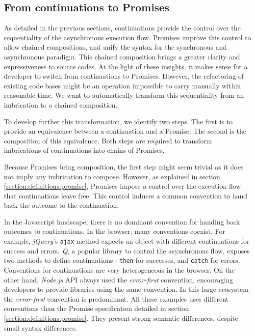\subsection{From continuations to Promises} \label{seciton:definitions:analysis}

As detailed in the previous sections, continuations provide the control over the sequentiality of the asynchronous execution flow.
Promises improve this control to allow chained compositions, and unify the syntax for the synchronous and asynchronous paradigm.
This chained composition brings a greater clarity and expressiveness to source codes.
At the light of these insights, it makes sense for a developer to switch from continuations to Promises.
However, the refactoring of existing code bases might be an operation impossible to carry manually within reasonable time.
We want to automatically transform this sequentiality from an imbrication to a chained composition.

To develop further this transformation, we identify two steps.
The first is to provide an equivalence between a continuation and a Promise.
The second is the composition of this equivalence.
Both steps are required to transform imbrications of continuations into chains of Promises.

Because Promises bring composition, the first step might seem trivial as it does not imply any imbrication to compose.
However, as explained in section \ref{section:definitions:promise}, Promises impose a control over the execution flow that continuations leave free.
This control induces a common convention to hand back the outcome to the continuation.

In the Javascript landscape, there is no dominant convention for handing back outcomes to continuations.
In the browser, many conventions coexist.
For example, \textit{jQuery}'s \texttt{ajax} method expects an object with different continuations for success and errors.
\textit{Q}, a popular library to control the asynchronous flow, exposes two methods to define continuations : \texttt{then} for successes, and \texttt{catch} for errors.
Conventions for continuations are very heterogeneous in the browser.
On the other hand, \textit{Node.js} API always used the \textit{error-first} convention, encouraging developers to provide libraries using the same convention.
In this large ecosystem the \textit{error-first} convention is predominant.
All these examples uses different conventions than the Promise specification detailed in section \ref{section:definitions:promise}.
They present strong semantic differences, despite small syntax differences.

